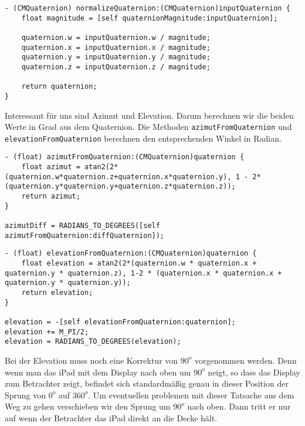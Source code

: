 \begin{lstlisting}[float=htb, caption=Methode \texttt{normalizeQuaternion}]
- (CMQuaternion) normalizeQuaternion:(CMQuaternion)inputQuaternion {
	float magnitude = [self quaternionMagnitude:inputQuaternion];
	
	quaternion.w = inputQuaternion.w / magnitude;
	quaternion.x = inputQuaternion.x / magnitude;
	quaternion.y = inputQuaternion.y / magnitude;
	quaternion.z = inputQuaternion.z / magnitude;
	
	return quaternion;
}
\end{lstlisting}

Interessant für uns sind Azimut und Elevation. Darum berechnen wir die beiden Werte in Grad aus dem Quaternion. Die Methoden \texttt{azimutFromQuaternion} und \texttt{elevationFromQuaternion} berechnen den entsprechenden Winkel in Radian.
~\\
\begin{lstlisting}[float=htb, caption=Azimut-Wert aus Quaternion berechnen]
- (float) azimutFromQuaternion:(CMQuaternion)quaternion {
	float azimut = atan2(2*(quaternion.w*quaternion.z+quaternion.x*quaternion.y), 1 - 2*(quaternion.y*quaternion.y+quaternion.z*quaternion.z));
	return azimut;
}

azimutDiff = RADIANS_TO_DEGREES([self azimutFromQuaternion:diffQuaternion]);
\end{lstlisting}

\begin{lstlisting}[float=htb, float=htb, caption=Elevation-Wert aus Quaternion berechnen, label=listing001]
- (float) elevationFromQuaternion:(CMQuaternion)quaternion {
	float elevation = atan2(2*(quaternion.w * quaternion.x + quaternion.y * quaternion.z), 1-2 * (quaternion.x * quaternion.x + quaternion.y * quaternion.y));
	return elevation;
} 

elevation = -[self elevationFromQuaternion:quaternion];
elevation += M_PI/2;
elevation = RADIANS_TO_DEGREES(elevation);
\end{lstlisting}

Bei der Elevation muss noch eine Korrektur von $90^o$ vorgenommen werden. Denn wenn man das iPad mit dem Display nach oben um $90^o$ neigt, so dass das Display zum Betrachter zeigt, befindet sich standardmäßig genau in dieser Position der Sprung von $0^o$ auf $360^o$. Um eventuellen problemen mit dieser Tatsache aus dem Weg zu gehen verschieben wir den Sprung um $90^o$ nach oben. Dann tritt er nur auf wenn der Betrachter das iPad direkt an die Decke hält.

